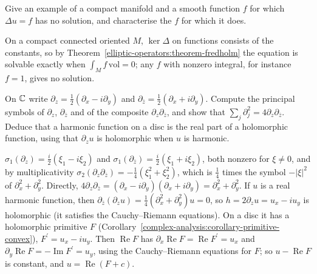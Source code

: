 \begin{exercise}\label{elliptic-operators:exercise-no-solutions}
Give an example of a compact manifold and a smooth function $f$ for which $\Delta u = f$ has no solution, and characterise the $f$ for which it does.
\end{exercise}

\begin{solution}
On a compact connected oriented $M$, $\ker\Delta$ on functions consists of the constants, so by Theorem~\ref{elliptic-operators:theorem-fredholm} the equation is solvable exactly when
$\int_Mf\,\mathrm{vol} = 0$; any $f$ with nonzero integral, for instance $f = 1$, gives no solution.
\end{solution}

\begin{exercise}\label{elliptic-operators:exercise-cauchy-riemann}
On $\mathbb{C}$ write $\partial_z = \frac12(\partial_x - i\partial_y)$ and $\partial_{\bar z} = \frac12(\partial_x + i\partial_y)$. Compute the principal symbols of $\partial_z$, $\partial_{\bar z}$ and of the composite
$\partial_z\partial_{\bar z}$, and show that $\sum_j\partial_j^2 = 4\partial_z\partial_{\bar z}$. Deduce that a harmonic function on a disc is the real part of a holomorphic function, using that
$\partial_zu$ is holomorphic when $u$ is harmonic.
\end{exercise}

\begin{solution}
$\sigma_1(\partial_z) = \frac i2(\xi_1 - i\xi_2)$ and $\sigma_1(\partial_{\bar z}) = \frac i2(\xi_1 + i\xi_2)$, both nonzero for $\xi \neq 0$, and by multiplicativity
$\sigma_2(\partial_z\partial_{\bar z}) = -\frac14(\xi_1^2 + \xi_2^2)$, which is $\frac14$ times the symbol $-|\xi|^2$ of $\partial_x^2 + \partial_y^2$. Directly,
$4\partial_z\partial_{\bar z} = (\partial_x - i\partial_y)(\partial_x + i\partial_y) = \partial_x^2 + \partial_y^2$. If $u$ is a real harmonic function, then $\partial_{\bar z}(\partial_zu) = \frac14(\partial_x^2 + \partial_y^2)u = 0$,
so $h = 2\partial_zu = u_x - iu_y$ is holomorphic (it satisfies the Cauchy--Riemann equations). On a disc it has a holomorphic primitive $F$ (Corollary~\ref{complex-analysis:corollary-primitive-convex}),
$F^{\prime} = u_x - iu_y$. Then $\operatorname{Re}F$ has $\partial_x\operatorname{Re}F = \operatorname{Re}F^{\prime} = u_x$ and $\partial_y\operatorname{Re}F = -\operatorname{Im}F^{\prime} = u_y$, using the Cauchy--Riemann
equations for $F$; so $u - \operatorname{Re}F$ is constant, and $u = \operatorname{Re}(F + c)$.
\end{solution}

